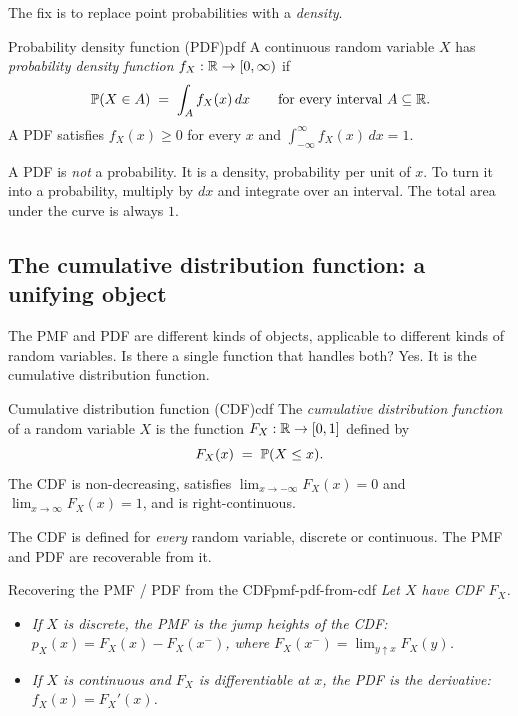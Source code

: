 The fix is to replace point probabilities with a \emph{density}.

\begin{definition}{Probability density function (PDF)}{pdf}
A continuous random variable $X$ has \emph{probability density function} $f_X : \mathbb{R} \to [0, \infty)$ if
\[
\mathbb{P}(X \in A) \;=\; \int_A f_X(x)\, dx \qquad \text{for every interval } A \subseteq \mathbb{R}.
\]
A PDF satisfies $f_X(x) \ge 0$ for every $x$ and $\int_{-\infty}^{\infty} f_X(x)\, dx = 1$.
\end{definition}

\begin{intuition}
A PDF is \emph{not} a probability. It is a density, probability per unit of $x$. To turn it into a probability, multiply by $dx$ and integrate over an interval. The total area under the curve is always $1$.
\end{intuition}



\subsection*{The cumulative distribution function: a unifying object}

The PMF and PDF are different kinds of objects, applicable to different kinds of random variables. Is there a single function that handles both? Yes. It is the cumulative distribution function.

\begin{definition}{Cumulative distribution function (CDF)}{cdf}
The \emph{cumulative distribution function} of a random variable $X$ is the function $F_X : \mathbb{R} \to [0, 1]$ defined by
\[
F_X(x) \;=\; \mathbb{P}(X \le x).
\]
The CDF is non-decreasing, satisfies $\lim_{x \to -\infty} F_X(x) = 0$ and $\lim_{x \to \infty} F_X(x) = 1$, and is right-continuous.
\end{definition}

The CDF is defined for \emph{every} random variable, discrete or continuous. The PMF and PDF are recoverable from it.

\begin{proposition}{Recovering the PMF / PDF from the CDF}{pmf-pdf-from-cdf}
\textit{Let $X$ have CDF $F_X$.}
\begin{itemize}
\item \textit{If $X$ is discrete, the PMF is the jump heights of the CDF: $p_X(x) = F_X(x) - F_X(x^-)$, where $F_X(x^-) = \lim_{y \uparrow x} F_X(y)$.}
\item \textit{If $X$ is continuous and $F_X$ is differentiable at $x$, the PDF is the derivative: $f_X(x) = F_X'(x)$.}
\end{itemize}
\end{proposition}

